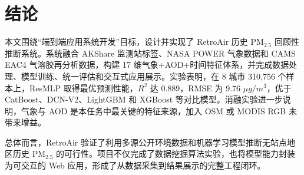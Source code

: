 \documentclass[UTF8,zihao=-4,a4paper]{ctexart}
\newcommand{\pmfine}{PM$_{2.5}$}
\newcommand{\aod}{AOD}
\begin{document}
\section{结论}

本文围绕“端到端应用系统开发”目标，设计并实现了 RetroAir 历史 \pmfine{} 回顾性推断系统。系统融合 AKShare 监测站标签、NASA POWER 气象数据和 CAMS EAC4 气溶胶再分析数据，构建 17 维气象+\aod{}+时间特征体系，并完成数据处理、模型训练、统一评估和交互式应用展示。实验表明，在 8 城市 310,756 个样本上，ResMLP 取得最优预测性能，$R^2$ 达 0.889，RMSE 为 9.76 $\mu g/m^3$，优于 CatBoost、DCN-V2、LightGBM 和 XGBoost 等对比模型。消融实验进一步说明，气象与 \aod{} 是本任务中最关键的特征来源，加入 OSM 或 MODIS RGB 未带来增益。

总体而言，RetroAir 验证了利用多源公开环境数据和机器学习模型推断无站点地区历史 \pmfine{} 的可行性。项目不仅完成了数据挖掘算法实验，也将模型能力封装为可交互的 Web 应用，形成了从数据采集到结果展示的完整工程闭环。
\end{document}
